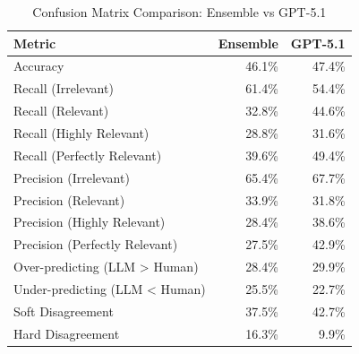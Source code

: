 \begin{table}[htbp]
\centering
\caption{Confusion Matrix Comparison: Ensemble vs GPT-5.1}
\label{tab:confusion-comparison}
\begin{tabular}{lrr}
\toprule
Metric & Ensemble & GPT-5.1 \\
\midrule
Accuracy & 46.1\% & 47.4\% \\
\midrule
Recall (Irrelevant) & 61.4\% & 54.4\% \\
Recall (Relevant) & 32.8\% & 44.6\% \\
Recall (Highly Relevant) & 28.8\% & 31.6\% \\
Recall (Perfectly Relevant) & 39.6\% & 49.4\% \\
\midrule
Precision (Irrelevant) & 65.4\% & 67.7\% \\
Precision (Relevant) & 33.9\% & 31.8\% \\
Precision (Highly Relevant) & 28.4\% & 38.6\% \\
Precision (Perfectly Relevant) & 27.5\% & 42.9\% \\
\midrule
Over-predicting (LLM > Human) & 28.4\% & 29.9\% \\
Under-predicting (LLM < Human) & 25.5\% & 22.7\% \\
\midrule
Soft Disagreement & 37.5\% & 42.7\% \\
Hard Disagreement & 16.3\% & 9.9\% \\
\bottomrule
\end{tabular}
\end{table}
